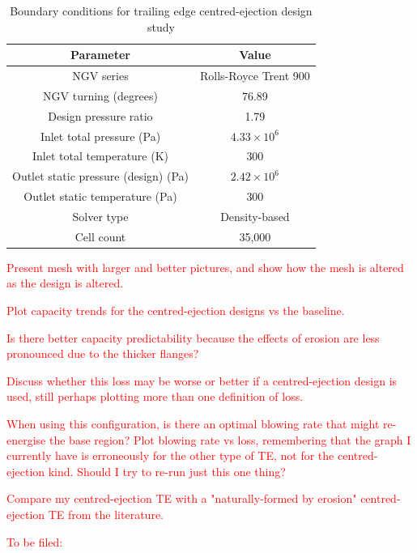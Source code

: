 \documentclass[a4paper, 11pt, twoside]{report}
\begin{document}
\begin{table}[H]
\caption{Boundary conditions for trailing edge centred-ejection design study}
\label{ps_cutbacks_parameters}
\begin{center}
\begin{tabular}{|c|c|}
\hline
Parameter & Value\\
\hline
NGV series & Rolls-Royce Trent 900\\
NGV turning (degrees) & 76.89\\
Design pressure ratio & 1.79\\
Inlet total pressure (Pa) & $4.33 \times 10^6$\\
Inlet total temperature (K) & 300\\
Outlet static pressure (design) (Pa) & $2.42 \times 10^6$\\
Outlet static temperature (Pa) & 300\\
Solver type & Density-based\\
Cell count & 35,000\\
\hline
\end{tabular}
\end{center}
\end{table}

\textcolor{red}{Present mesh with larger and better pictures, and show how the mesh is altered as the design is altered.}

\textcolor{red}{Plot capacity trends for the centred-ejection designs vs the baseline.}

\textcolor{red}{Is there better capacity predictability because the effects of erosion are less pronounced due to the thicker flanges?}

\textcolor{red}{Discuss whether this loss may be worse or better if a centred-ejection design is used, still perhaps plotting more than one definition of loss.}

\textcolor{red}{When using this configuration, is there an optimal blowing rate that might re-energise the base region? Plot blowing rate vs loss, remembering that the graph I currently have is erroneously for the other type of TE, not for the centred-ejection kind. Should I try to re-run just this one thing?}

\textcolor{red}{Compare my centred-ejection TE with a "naturally-formed by erosion" centred-ejection TE from the literature.} 

\textcolor{red}{To be filed:}
\end{document}
